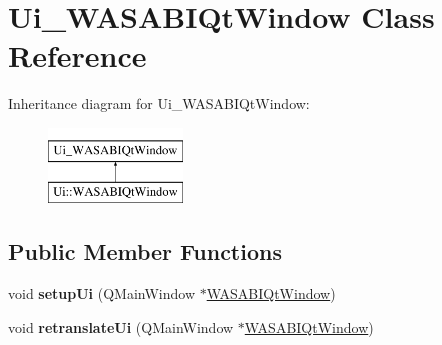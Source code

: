 \hypertarget{class_ui___w_a_s_a_b_i_qt_window}{
\section{\-Ui\-\_\-\-W\-A\-S\-A\-B\-I\-Qt\-Window \-Class \-Reference}
\label{class_ui___w_a_s_a_b_i_qt_window}
}
\-Inheritance diagram for \-Ui\-\_\-\-W\-A\-S\-A\-B\-I\-Qt\-Window\-:\begin{figure}[H]
\begin{center}
\leavevmode
\includegraphics[height=2.000000cm]{class_ui___w_a_s_a_b_i_qt_window}
\end{center}
\end{figure}
\subsection*{\-Public \-Member \-Functions}
\begin{DoxyCompactItemize}
\item 
\hypertarget{class_ui___w_a_s_a_b_i_qt_window_ad8573fe1fadc64785a93e0e4a9a13a14}{
void {\bfseries setup\-Ui} (\-Q\-Main\-Window $\ast$\hyperlink{class_w_a_s_a_b_i_qt_window}{\-W\-A\-S\-A\-B\-I\-Qt\-Window})}
\label{class_ui___w_a_s_a_b_i_qt_window_ad8573fe1fadc64785a93e0e4a9a13a14}

\item 
\hypertarget{class_ui___w_a_s_a_b_i_qt_window_a0a1faf27658d03735637c6ec2ec2a66d}{
void {\bfseries retranslate\-Ui} (\-Q\-Main\-Window $\ast$\hyperlink{class_w_a_s_a_b_i_qt_window}{\-W\-A\-S\-A\-B\-I\-Qt\-Window})}
\label{class_ui___w_a_s_a_b_i_qt_window_a0a1faf27658d03735637c6ec2ec2a66d}

\end{DoxyCompactItemize}
